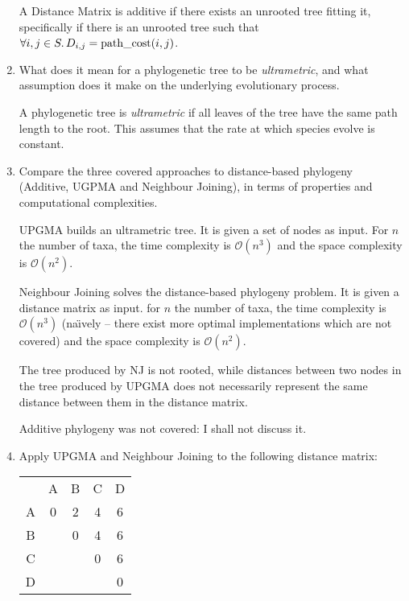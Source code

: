 \documentclass[10pt,\jkfside,a4paper]{article}
\begin{document}
\begin{enumerate}
\begin{definition}
        A Distance Matrix is additive if there exists an unrooted tree fitting it, specifically if there is an unrooted tree such that $\forall i, j \in S\ldotp D_{i, j} = \mathrm{path\_cost}(i, j)$.

    \end{definition}

    \item What does it mean for a phylogenetic tree to be \textit{ultrametric}, and what assumption does it make on the underlying evolutionary process.

    A phylogenetic tree is \textit{ultrametric} if all leaves of the tree have the same path length to the root. This assumes that the rate at which species evolve is constant.

    \item Compare the three covered approaches to distance-based phylogeny (Additive, UGPMA and Neighbour Joining), in terms of properties and computational complexities.

    UPGMA builds an ultrametric tree. It is given a set of nodes as input. For $n$ the number of taxa, the time complexity is $\mathcal O(n^3)$ and the space complexity is $\mathcal O(n^2)$.

    Neighbour Joining solves the distance-based phylogeny problem. It is given a distance matrix as input. for $n$ the number of taxa, the time complexity is $\mathcal O(n^3)$ (na\"{\i}vely -- there exist more
    optimal implementations which are not covered) and the space complexity is $\mathcal O(n^2)$.

    The tree produced by NJ is not rooted, while distances between two nodes in the tree produced by UPGMA does not necessarily represent the same distance between them in the distance matrix.

    Additive phylogeny was not covered: I shall not discuss it.

    \item Apply UPGMA and Neighbour Joining to the following distance matrix:

    \begin{table}[H]

        \centering

        \begin{tabular}{ccccc}

            & A & B & C & D \\
            A & 0 & 2 & 4 & 6 \\
            B & & 0 & 4 & 6 \\
            C & & & 0 & 6 \\
            D & & & & 0 \\


\end{tabular}
\end{table}
\end{enumerate}
\end{document}
